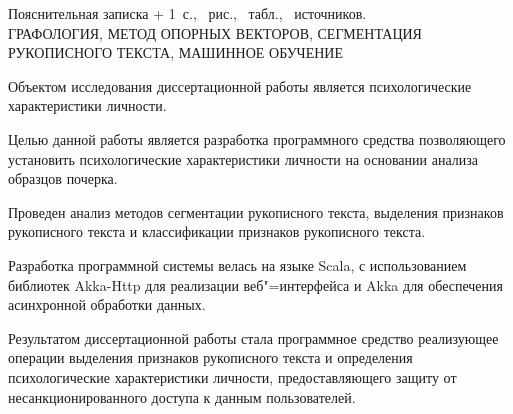 
\newcommand{\totpages}{\number\numexpr\getpagerefnumber{LastPage} + 1}

\begin{center}
    Пояснительная записка \totpages~с., \totfig{}~рис., \tottab{}~табл., \totref{}~источников.
    \\ 
    \MakeUppercase{графология,  метод опорных векторов, сегментация рукописного текста, машинное обучение}
\end{center}

Объектом исследования диссертационной работы является психологические характеристики личности.

Целью данной работы является разработка программного средства позволяющего установить психологические характеристики личности на основании анализа образцов почерка.

Проведен анализ методов сегментации рукописного текста, выделения признаков рукописного текста и классификации признаков рукописного текста.

Разработка программной системы велась на языке Scala, с использованием библиотек Akka-Http для реализации веб"=интерфейса и Akka для обеспечения асинхронной обработки данных. 

Результатом диссертационной работы стала программное средство реализующее операции выделения признаков рукописного текста и определения психологические характеристики личности, предоставляющего защиту от несанкционированного доступа к данным пользователей.

\clearpage